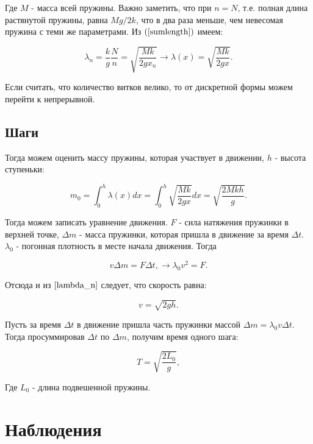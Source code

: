 \documentclass[a4paper,12pt]{report}
\begin{document}
Где $M$ - масса всей пружины. Важно заметить, что при $n=N$, т.е. полная длина растянутой пружины, равна $Mg/2k$, что в два раза меньше, чем невесомая пружина с теми же параметрами. Из $(\ref{sumlength})$ имеем:

\begin{equation} \label{lambda_n}
	\lambda_n=\frac{k}{g} \frac{N}{n} = \sqrt{\frac{Mk}{2gx_n}} \rightarrow \lambda(x)=\sqrt{\frac{Mk}{2gx}}.
\end{equation}

Если считать, что количество витков велико, то от дискретной формы можем перейти к непрерывной.
	
\subsection*{Шаги} \text{ }

Тогда можем оценить массу пружины, которая участвует в движении, $h$ - высота ступеньки: 

\begin{equation} \label{integral}
	m_0 = \int_{0}^{h} \lambda(x) dx = \int_{0}^{h} \sqrt{\frac{Mk}{2gx}} dx = \sqrt{\frac{2Mkh}{g}}.
\end{equation}

Тогда можем записать уравнение движения. $F$ - сила натяжения пружинки в верхней точке, $\Delta m$ - масса пружинки, которая пришла в движение за время $\Delta t$. $\lambda_0$ - погонная плотность в месте начала движения. Тогда 

\begin{equation}
	v \Delta m = F \Delta t, \longrightarrow \lambda_0 v^2 = F.
\end{equation}

Отсюда и из $\ref{lambda_n}$ следует, что скорость равна:

\begin{equation}
	v = \sqrt{2gh}.
\end{equation}

Пусть за время $\Delta t$ в движение пришла часть пружинки массой $\Delta m = \lambda_0 v \Delta t$. Тогда просуммировав $\Delta t$ по $\Delta m$, получим время одного шага:

\begin{equation} \label{period}
	T = \sqrt{\frac{2L_0}{g}}, 
\end{equation}

Где $L_0$ - длина подвешенной пружины.

\section*{Наблюдения}
\end{document}

